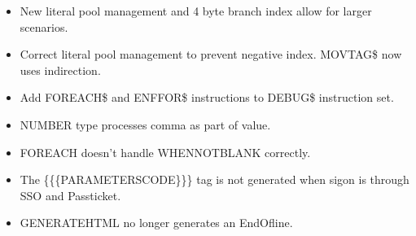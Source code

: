 \documentclass[letterpaper,10pt,english]{sphinxmanual}
\begin{document}
\begin{itemize}
\item {} 
New literal pool management and 4 byte branch index allow for larger scenarios.

\end{itemize}

\begin{itemize}
\item {} 
Correct literal pool management to prevent negative index. MOVTAG\$ now uses indirection.

\end{itemize}

\begin{itemize}
\item {} 
Add FOREACH\$ and ENFFOR\$ instructions to DEBUG\$ instruction set.

\end{itemize}

\begin{itemize}
\item {} 
NUMBER type processes comma as part of value.

\end{itemize}

\begin{itemize}
\item {} 
FOR\sphinxhyphen{}EACH doesn’t handle WHEN\sphinxhyphen{}NOT\sphinxhyphen{}BLANK correctly.

\end{itemize}

\begin{itemize}
\item {} 
The \{\{\{PARAMETERS\sphinxhyphen{}CODE\}\}\} tag is not generated when sigon is through SSO and Passticket.

\end{itemize}

\begin{itemize}
\item {} 
GENERATE\sphinxhyphen{}HTML no longer generates an End\sphinxhyphen{}Of\sphinxhyphen{}line.

\end{itemize}
\end{document}
